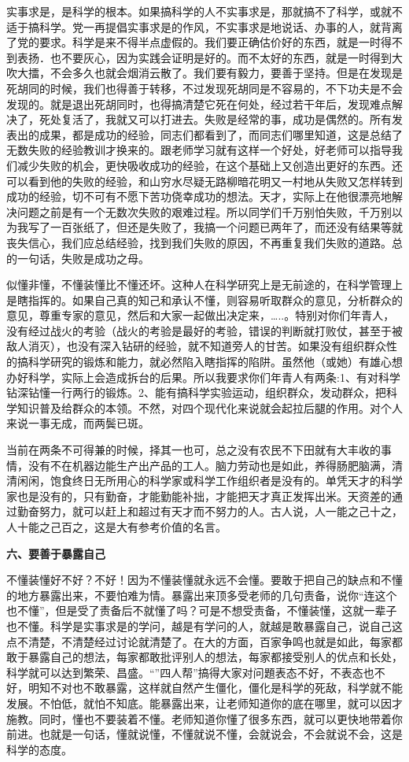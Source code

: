 \documentclass[twoside,openright,headings=optiontohead]{ctexbook} %
\begin{document}
{实事求是，是科学的根本。如果搞科学的人不实事求是，那就搞不了科学，或就不适于搞科学。党一再提倡实事求是的作风，不实事求是地说话、办事的人，就背离了党的要求。科学是来不得半点虚假的。我们要正确估价好的东西，就是一时得不到表扬．也不要灰心，因为实践会证明是好的。而不太好的东西，就是一时得到大吹大擂，不会多久也就会烟消云散了。我们要有毅力，要善于坚持。但是在发现是死胡同的时候，我们也得善于转移，不过发现死胡同是不容易的，不下功夫是不会发现的。就是退出死胡同时，也得搞清楚它死在何处，经过若干年后，发现难点解决了，死处复活了，我就又可以打进去。失败是经常的事，成功是偶然的。所有发表出的成果，都是成功的经验，同志们都看到了，而同志们哪里知道，这是总结了无数失败的经验教训才换来的。跟老师学习就有这样一个好处，好老师可以指导我们减少失败的机会，更快吸收成功的经验，在这个基础上又创造出更好的东西。还可以看到他的失败的经验，和山穷水尽疑无路柳暗花明又一村地从失败又怎样转到成功的经验，切不可有不愿下苦功侥幸成功的想法。天才，实际上在他很漂亮地解决问题之前是有一个无数次失败的艰难过程。所以同学们千万别怕失败，千万别以为我写了一百张纸了，但还是失败了，我搞一个问题已两年了，而还没有结果等就丧失信心，我们应总结经验，找到我们失败的原因，不再重复我们失败的道路。总的一句话，失败是成功之母。

似懂非懂，不懂装懂比不懂还坏。这种人在科学研究上是无前途的，在科学管理上是瞎指挥的。如果自己真的知己和承认不懂，则容易听取群众的意见，分析群众的意见，尊重专家的意见，然后和大家一起做出决定来，\ldots{}..。特别对你们年青人，没有经过战火的考验（战火的考验是最好的考验，错误的判断就打败仗，甚至于被敌人消灭），也没有深入钻研的经验，就不知道旁人的甘苦。如果没有组织群众性的搞科学研究的锻炼和能力，就必然陷入瞎指挥的陷阱。虽然他（或她）有雄心想办好科学，实际上会造成拆台的后果。所以我要求你们年青人有两条:1、有对科学钻深钻懂一行两行的锻炼。2、能有搞科学实验运动，组织群众，发动群众，把科学知识普及给群众的本领。不然，对四个现代化来说就会起拉后腿的作用。对个人来说一事无成，而两鬓已斑。

当前在两条不可得兼的时候，择其一也可，总之没有农民不下田就有大丰收的事情，没有不在机器边能生产出产品的工人。脑力劳动也是如此，养得肠肥脑满，清清闲闲，饱食终日无所用心的科学家或科学工作组织者是没有的。单凭天才的科学家也是没有的，只有勤奋，才能勤能补拙，才能把天才真正发挥出米。天资差的通过勤奋努力，就可以赶上和超过有天才而不努力的人。古人说，人一能之己十之，人十能之己百之，这是大有参考价值的名言。

\textbf{六、要善于暴露自己}

不懂装懂好不好？不好！因为不懂装懂就永远不会懂。要敢于把自己的缺点和不懂的地方暴露出来，不要怕难为情。暴露出来顶多受老师的几句责备，说你``连这个也不懂''，但是受了责备后不就懂了吗？可是不想受责备，不懂装懂，这就一辈子也不懂。科学是实事求是的学问，越是有学问的人，就越是敢暴露自己，说自己这点不清楚，不清楚经过讨论就清楚了。在大的方面，百家争鸣也就是如此，每家都敢于暴露自己的想法，每家都敢批评别人的想法，每家都接受别人的优点和长处，科学就可以达到繁荣、昌盛。``''四人帮''搞得大家对问題表态不好，不表态也不好，明知不对也不敢暴露，这样就自然产生僵化，僵化是科学的死敌，科学就不能发展。不怕低，就怕不知底。能暴露出来，让老师知道你的底在哪里，就可以因才施教。同时，懂也不要装着不懂。老师知道你懂了很多东西，就可以更快地带着你前进。也就是一句话，懂就说懂，不懂就说不懂，会就说会，不会就说不会，这是科学的态度。

}
\end{document}
